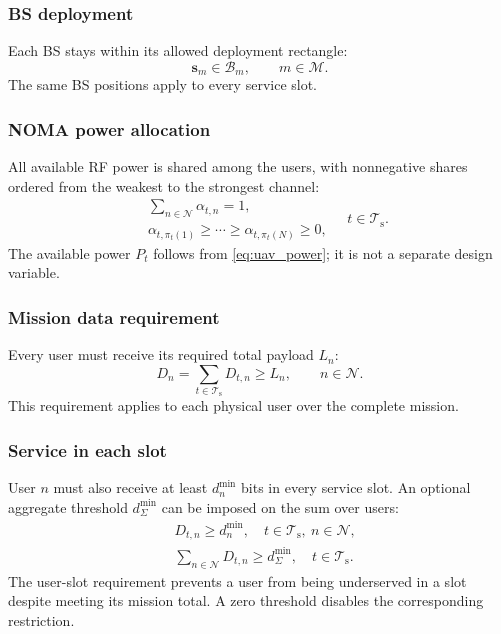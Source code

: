 \documentclass[conference]{IEEEtran}
\newcommand{\setT}{\mathcal{T}_{\mathrm{s}}}
\newcommand{\setN}{\mathcal{N}}
\newcommand{\setM}{\mathcal{M}}
\begin{document}
\subsubsection{BS deployment}
Each BS stays within its allowed deployment rectangle:
\begin{equation}
\bm s_m\in\mathcal B_m,\qquad m\in\setM.
\tag{C2}\label{eq:c_bs}
\end{equation}
The same BS positions apply to every service slot.

\subsubsection{NOMA power allocation}
All available RF power is shared among the users, with nonnegative shares ordered from the weakest to the strongest channel:
\begin{equation}
\begin{aligned}
&\sum_{n\in\setN}\alpha_{t,n}=1,\\
&\alpha_{t,\pi_t(1)}\ge\cdots\ge\alpha_{t,\pi_t(N)}\ge0,
\end{aligned}
\quad t\in\setT.
\tag{C3}\label{eq:c_noma}
\end{equation}
The available power $P_t$ follows from \cref{eq:uav_power}; it is not a separate design variable.

\subsubsection{Mission data requirement}
Every user must receive its required total payload $L_n$:
\begin{equation}
D_n=\sum_{t\in\setT}D_{t,n}\ge L_n,\qquad n\in\setN.
\tag{C4}\label{eq:c_payload}
\end{equation}
This requirement applies to each physical user over the complete mission.

\subsubsection{Service in each slot}
User $n$ must also receive at least $d_n^{\min}$ bits in every service slot. An optional aggregate threshold $d_{\Sigma}^{\min}$ can be imposed on the sum over users:
\begin{equation}
\begin{aligned}
&D_{t,n}\ge d_n^{\min},\quad t\in\setT,\ n\in\setN,\\
&\sum_{n\in\setN}D_{t,n}\ge d_{\Sigma}^{\min},\quad t\in\setT.
\end{aligned}
\tag{C5}\label{eq:c_user_slot}
\end{equation}
The user-slot requirement prevents a user from being underserved in a slot despite meeting its mission total. A zero threshold disables the corresponding restriction.
\end{document}
